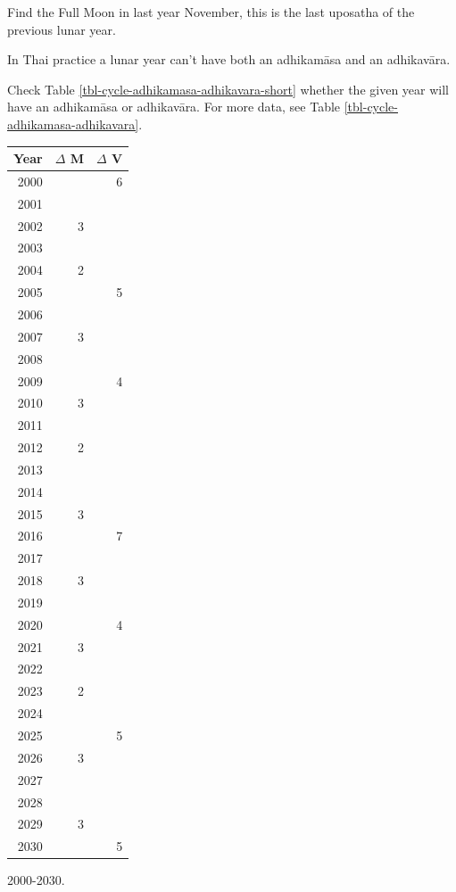 \documentclass[11pt,oneside]{memoir-article}
\begin{document}
Find the Full Moon in last year November, this is the last uposatha of the
previous lunar year.

In Thai practice a lunar year can't have both an adhikamāsa and an adhikavāra.

Check Table \ref{tbl-cycle-adhikamasa-adhikavara-short} whether the given year
will have an adhikamāsa or adhikavāra. For more data, see Table
\ref{tbl-cycle-adhikamasa-adhikavara}.

\begin{margintable}[-80mm]
\begin{center}
\begin{tabular}{rrr}
Year & $\Delta$ M & $\Delta$ V\\
\hline
2000 &  & 6\\
2001 &  & \\
2002 & 3 & \\
2003 &  & \\
2004 & 2 & \\
2005 &  & 5\\
2006 &  & \\
2007 & 3 & \\
2008 &  & \\
2009 &  & 4\\
2010 & 3 & \\
2011 &  & \\
2012 & 2 & \\
2013 &  & \\
2014 &  & \\
2015 & 3 & \\
2016 &  & 7\\
2017 &  & \\
2018 & 3 & \\
2019 &  & \\
2020 &  & 4\\
2021 & 3 & \\
2022 &  & \\
2023 & 2 & \\
2024 &  & \\
2025 &  & 5\\
2026 & 3 & \\
2027 &  & \\
2028 &  & \\
2029 & 3 & \\
2030 &  & 5\\
\end{tabular}
\end{center}
\caption{\label{tbl-cycle-adhikamasa-adhikavara-short} 2000-2030.}
\end{margintable}
\end{document}

